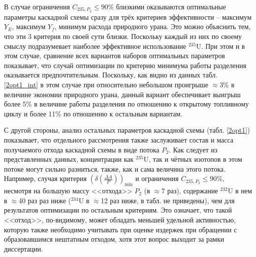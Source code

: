 {В случае ограничения $C_{235,{P_2}} \leq 90\%$ близкими оказываются оптимальные параметры каскадной схемы сразу для трёх критериев эффективности -- максимум $Y_E$, максимум $Y_f$, минимум расхода природного урана. Это можно объяснить тем, что эти 3 критерия по своей сути близки. Поскольку каждый из них по своему смыслу подразумевает наиболее эффективное использование $^{235}$U. При этом и в этом случае, сравнение всех вариантов наборов оптимальных параметров показывает, что случай оптимизации по критерию минимума работы разделения оказывается предпочтительным. Поскольку, как видно из данных табл. \ref{2opt1_int} в этом случае при относительно небольшом проигрыше $\approx$3\% в величине экономии природного урана, данный вариант обеспечивает выигрыш более 5\% в величине работы разделения по отношению к открытому топливному циклу и более 11\% по отношению к остальным вариантам.

С другой стороны, анализ остальных параметров каскадной схемы (табл. \ref{2opt1}) показывает, что отдельного рассмотрения также заслуживает состав и масса получаемого отхода каскадной схемы в виде потока $P_2$. Как следует из представленных данных, концентрации как $^{235}$U, так и чётных изотопов в этом потоке могут сильно разниться, также, как и сама величина этого потока. Например, случая критерия $(\delta(\frac{\Delta A}{P}))_\text{min}$ и ограничения $C_{235,{P_2}} \leq 90\%$, несмотря на большую массу <<отхода>> $P_{2}$ (в $\approx$7 раз), содержание $^{232}$U в нем в $\approx$40 раз раз ниже ($^{234}$U в $\approx$12 раз ниже, в табл. не приведены), чем для результатов оптимизации по остальным критериям. Это означает, что такой <<отход>>, по-видимому, может обладать меньшей удельной активностью, которую также необходимо учитывать при оценке издержек при обращении с образовавшимся нештатным отходом, хотя этот вопрос выходит за рамки диссертации. 

}
